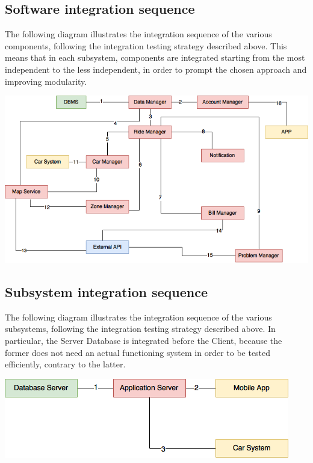 \subsection{Software integration sequence}
The following diagram illustrates the integration sequence of the various components, following the integration testing strategy described above. This means that in each subsystem, components are integrated starting from the most independent to the less independent, in order to prompt the chosen approach and improving modularity. 
\begin{center}
	\includegraphics[width=\textwidth]{Diagrams/SoftwareIntegrationDiagram.png}
\end{center}

\subsection{Subsystem integration sequence}
The following diagram illustrates the integration sequence of the various subsystems, following the integration testing strategy described above. In particular, the Server Database is integrated before the Client, because the former does not need an actual functioning system in order to be tested efficiently, contrary to the latter.
\begin{center}
	\includegraphics[width=\textwidth]{Diagrams/SubsystemsIntegrationDiagram.png}
\end{center}